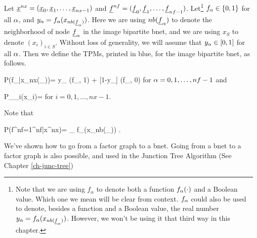 Let ${\underline{x}}^{nx}=
({\underline{x}}_0, {\underline{x}}_1, \ldots, {\underline{x}}_{nx-1})$
and
${\underline{f}}^{nf}=
({\underline{f}}_0, {\underline{f}}_1, \ldots, {\underline{f}}_{nf-1})$.
Let\footnote{
Note that we are using
$f_\alpha$
to denote both a function
$f_\alpha(\cdot)$  and a Boolean
value. Which one we mean
will be clear from context.
$f_\alpha$ could also be used to
denote, besides a function and a Boolean value,
the real number
$y_\alpha=f_\alpha(x_{nb({\underline{f}}_\alpha)})$.
However, we won't be using it that third way
in this chapter.}
$f_\alpha\in \{0,1\}$ for all $\alpha$,
and $y_\alpha=
f_\alpha(x_{nb({\underline{f}}_\alpha)})$.
Here we are using $nb({\underline{f}}_\alpha)$
to denote  the neighborhood
of node ${\underline{f}}_\alpha$
in the image bipartite bnet,
and we are using $x_S$ to denote
$(x_i)_{i\in S}$.
Without loss of
generality,
we will assume
that $y_\alpha\in[0,1]$ for all $\alpha$.
Then we define the TPMs, printed
in blue, for the
image bipartite bnet, 
as follows.




\beq\color{blue}
P(f_\alpha|x_{nx(\rvf_\alpha)})=
y_\alp
\delta(f_\alp, 1)
+
[1-y_\alp]
\delta(f_\alp, 0)
\;
\eeq
for $\alpha=0, 1, \ldots , nf-1$
and

\beq\color{blue}
P_{\rvx_i}(x_i)= 
\eeq
for $i=0, 1, \ldots, nx-1$.

Note that

\beq
P(f^{nf}=1^{nf}|x^{nx})=
\prod_\alpha
f_\alpha(x_{nb(\rvf_\alpha)})
\;.
\eeq

We've shown
how to go from a factor graph
to a bnet.
Going from a
bnet to a factor graph
is also possible,
and used in the Junction Tree
Algorithm (See Chapter \ref{ch-junc-tree})



